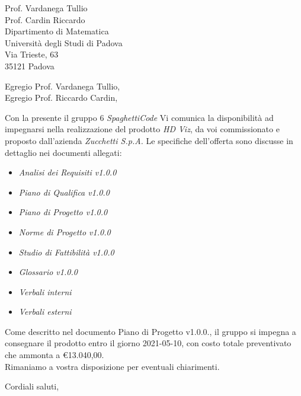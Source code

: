 \documentclass[a4paper,12pt]{letteracdp}
\date{11 gennaio 2021}
\begin{document}
\begin{letter}{
		\vspace*{-2\baselineskip}
		Prof. Vardanega Tullio \\
		Prof. Cardin Riccardo \\
		Dipartimento di Matematica \\
		Università degli Studi di Padova \\
		Via Trieste, 63 \\
		35121 Padova}
	
	\opening{Egregio Prof. Vardanega Tullio, \\ \noindent Egregio Prof. Riccardo Cardin,}
	
	\begin{flushleft}
	Con la presente il gruppo 6 \textit{SpaghettiCode} Vi comunica la disponibilità ad impegnarsi nella realizzazione del prodotto \textit{HD Viz}, da voi commissionato e proposto dall'azienda \textit{Zucchetti S.p.A.}
	Le specifiche dell'offerta sono discusse in dettaglio nei documenti allegati:
	\end{flushleft}

	\begin{itemize}
		\item \emph{Analisi dei Requisiti v1.0.0}
		\item \emph{Piano di Qualifica v1.0.0}
		\item \emph{Piano di Progetto v1.0.0}
		\item \emph{Norme di Progetto v1.0.0}
		\item \emph{Studio di Fattibilità v1.0.0}
		\item \emph{Glossario v1.0.0}
		\item \emph{Verbali interni}
		\item \emph{Verbali esterni}
	\end{itemize}

	\begin{flushleft}
	\noindent Come descritto nel documento Piano di Progetto v1.0.0., il gruppo si impegna a consegnare il prodotto entro il giorno 2021-05-10, con costo totale preventivato che ammonta a \euro{13.040,00}.
	\\
	
	Rimaniamo a vostra disposizione per eventuali chiarimenti.
	\end{flushleft}

	\closing{Cordiali saluti,}
	
\end{letter}	
\end{document}
